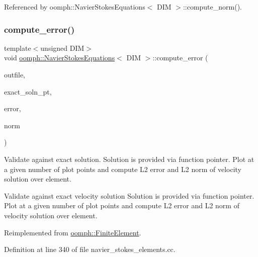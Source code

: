Referenced by oomph\+::\+Navier\+Stokes\+Equations$<$ D\+I\+M $>$\+::compute\+\_\+norm().

\mbox{\label{classoomph_1_1NavierStokesEquations_ad863482966795758da5b70bbf35e6e6e}} 
\subsubsection{\texorpdfstring{compute\+\_\+error()}{compute\_error()}\hspace{0.1cm}{\footnotesize\ttfamily [2/2]}}
{\footnotesize\ttfamily template$<$unsigned D\+IM$>$ \\
void \hyperlink{classoomph_1_1NavierStokesEquations}{oomph\+::\+Navier\+Stokes\+Equations}$<$ D\+IM $>$\+::compute\+\_\+error (\begin{DoxyParamCaption}\item[{std\+::ostream \&}]{outfile,  }\item[{\hyperlink{classoomph_1_1FiniteElement_a690fd33af26cc3e84f39bba6d5a85202}{Finite\+Element\+::\+Steady\+Exact\+Solution\+Fct\+Pt}}]{exact\+\_\+soln\+\_\+pt,  }\item[{double \&}]{error,  }\item[{double \&}]{norm }\end{DoxyParamCaption})\hspace{0.3cm}{\ttfamily [virtual]}}



Validate against exact solution. Solution is provided via function pointer. Plot at a given number of plot points and compute L2 error and L2 norm of velocity solution over element. 

Validate against exact velocity solution Solution is provided via function pointer. Plot at a given number of plot points and compute L2 error and L2 norm of velocity solution over element. 

Reimplemented from \hyperlink{classoomph_1_1FiniteElement_a73c79a1f1e5b1d334757812a6bbd58ff}{oomph\+::\+Finite\+Element}.



Definition at line 340 of file navier\+\_\+stokes\+\_\+elements.\+cc.



